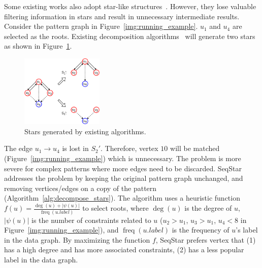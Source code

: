 
Some existing works also adopt star-like structures~\cite{DBLP:journals/pvldb/SunWWSL12,DBLP:journals/pvldb/LaiQLC15}. However, they lose valuable filtering information in stars and result in unnecessary intermediate results.
Consider the pattern graph in Figure~\ref{img:running_example}. $u_1$ and $u_4$ are selected as the roots.
Existing decomposition algorithms~\cite{DBLP:journals/pvldb/SunWWSL12,DBLP:journals/pvldb/LaiQLC15} will generate two stars as shown in Figure~\ref{img:stwig}.
\begin{figure}[ht]
  \centering
  \includegraphics[width=0.35\textwidth]{img/stwig.pdf}
  \caption{Stars generated by existing algorithms.}\label{img:stwig}
\end{figure}
The edge $u_1 \rightarrow u_4$ is lost in $S_2'$.
Therefore, vertex $10$ will be matched (Figure~\ref{img:running_example}) which is unnecessary.
The problem is more severe for complex patterns where more edges need to be discarded.
SeqStar addresses the problem by keeping the original pattern graph unchanged, and removing vertices/edges on a copy of the pattern (Algorithm~\ref{alg:decompose_stars}).
The algorithm uses a heuristic function $f(u) = \frac{\deg(u) + |\psi(u)|}{\operatorname{freq}(u.label)}$ to select roots,
where $\deg(u)$ is the degree of $u$, $|\psi(u)|$ is the number of constraints related to $u$ ($u_2 > u_1$, $u_3 > u_1$, $u_4 < 8$ in Figure~\ref{img:running_example}),
and $\operatorname{freq}(u.label)$ is the frequency of $u$'s label in the data graph.
By maximizing the function $f$,
SeqStar prefers vertex that
(1) has a high degree and has more associated constraints,
(2) has a less popular label in the data graph. 

